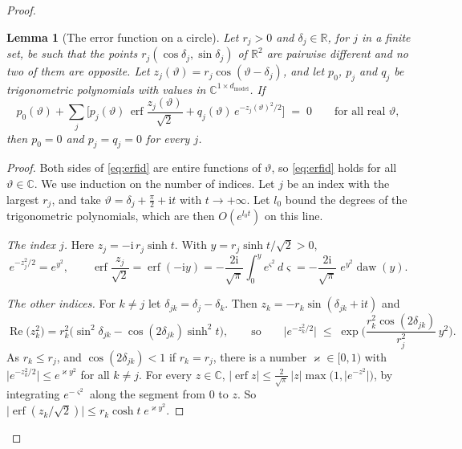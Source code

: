 \documentclass[10pt]{article}
\newtheorem{lemma}[theorem]{Lemma}
\theoremstyle{definition}
\theoremstyle{remark}
\newcommand{\R}{\mathbb{R}}
\newcommand{\dm}{d_{\mathrm{model}}}
\newenvironment{nested}{\par\nopagebreak\def\FrameCommand{\hspace{0.5em}{\color{black!30}\vrule width 0.6pt}\hspace{1em}}\MakeFramed{\advance\hsize-\width\FrameRestore}}{\endMakeFramed}
\begin{document}
\begin{proof}
\begin{nested}
\begin{lemma}[The error function on a circle]\label{lem:erfcircle}
Let $r_j > 0$ and $\delta_j \in \R$, for $j$ in a finite set, be such that the points $r_j(\cos\delta_j, \sin\delta_j)$ of $\R^2$ are pairwise different and no two of them are opposite. Let $z_j(\vartheta) = r_j\cos(\vartheta - \delta_j)$, and let $p_0$, $p_j$ and $q_j$ be trigonometric polynomials with values in $\mathbb C^{1\times\dm}$. If
\begin{equation}\label{eq:erfid}
p_0(\vartheta) + \sum_j\Big[p_j(\vartheta)\,\operatorname{erf}\frac{z_j(\vartheta)}{\sqrt2} + q_j(\vartheta)\,e^{-z_j(\vartheta)^2/2}\Big] \;=\; 0 \qquad\text{for all real } \vartheta,
\end{equation}
then $p_0 = 0$ and $p_j = q_j = 0$ for every $j$.
\end{lemma}

\begin{proof}
Both sides of \eqref{eq:erfid} are entire functions of $\vartheta$, so \eqref{eq:erfid} holds for all $\vartheta \in \mathbb C$. We use induction on the number of indices. Let $j$ be an index with the largest $r_j$, and take $\vartheta = \delta_j + \tfrac{\pi}{2} + \mathrm it$ with $t \to +\infty$. Let $l_0$ bound the degrees of the trigonometric polynomials, which are then $O(e^{l_0t})$ on this line.

\emph{The index $j$.} Here $z_j = -\mathrm i\,r_j\sinh t$. With $y = r_j\sinh t/\sqrt2 > 0$,
\[
e^{-z_j^2/2} = e^{y^2}, \qquad \operatorname{erf}\frac{z_j}{\sqrt2} = \operatorname{erf}(-\mathrm iy) = -\frac{2\mathrm i}{\sqrt\pi}\int_0^y e^{\varsigma^2}\,d\varsigma = -\frac{2\mathrm i}{\sqrt\pi}\;e^{y^2}\operatorname{daw}(y).
\]

\emph{The other indices.} For $k \neq j$ let $\delta_{jk} = \delta_j - \delta_k$. Then $z_k = -r_k\sin(\delta_{jk} + \mathrm it)$ and
\[
\operatorname{Re}\big(z_k^2\big) = r_k^2\big(\sin^2\delta_{jk} - \cos(2\delta_{jk})\sinh^2 t\big), \qquad\text{so}\qquad \big\lvert e^{-z_k^2/2}\big\rvert \;\le\; \exp\Big(\frac{r_k^2\cos(2\delta_{jk})}{r_j^2}\,y^2\Big).
\]
As $r_k \le r_j$, and $\cos(2\delta_{jk}) < 1$ if $r_k = r_j$, there is a number $\varkappa \in [0, 1)$ with $\lvert e^{-z_k^2/2}\rvert \le e^{\varkappa y^2}$ for all $k \neq j$. For every $z \in \mathbb C$, $\lvert\operatorname{erf}z\rvert \le \tfrac{2}{\sqrt\pi}\,\lvert z\rvert\max\big(1, \lvert e^{-z^2}\rvert\big)$, by integrating $e^{-\varsigma^2}$ along the segment from $0$ to $z$. So $\lvert\operatorname{erf}(z_k/\sqrt2)\rvert \le r_k\cosh t\;e^{\varkappa y^2}$.


\end{proof}
\end{nested}
\end{proof}
\end{document}
